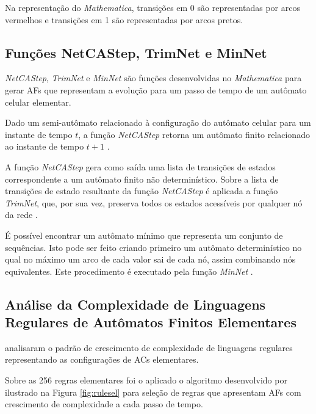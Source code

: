 \documentclass[12pt,a4paper]{article}
\begin{document}
Na representação do \textit{Mathematica}, transições em 0 são
representadas por arcos vermelhos e transições em 1 são
representadas por arcos pretos.

\subsection{Funções NetCAStep, TrimNet e MinNet}

\emph{NetCAStep}, \emph{TrimNet} e \emph{MinNet}  são
funções desenvolvidas no \textit{Mathematica} para gerar AFs
que representam a evolução para um passo de tempo de um autômato celular
elementar.

Dado um semi-autômato relacionado à configuração do autômato celular para
um instante de tempo $t$, a função \emph{NetCAStep} 
retorna um autômato finito relacionado ao instante de tempo $t+1$
.

A função \emph{NetCAStep} gera como saída uma lista de transições
de estados correspondente a um autômato finito não determinístico.
Sobre a lista de transições de estado resultante da função
\emph{NetCAStep} é aplicada a função \emph{TrimNet}, que, por sua vez,
preserva todos os estados acessíveis por qualquer nó da rede
.

É possível encontrar um autômato mínimo que representa um conjunto
de sequências. Isto pode ser feito criando primeiro um autômato
determinístico no qual no máximo um arco de cada valor sai de cada
nó, assim combinando nós equivalentes. Este procedimento é
executado pela função \emph{MinNet} .

\subsection{Análise da Complexidade de Linguagens Regulares de Autômatos
Finitos Elementares}

 analisaram o padrão de crescimento de complexidade
de linguagens regulares representando as configurações de ACs
elementares.

Sobre as 256 regras elementares foi o aplicado o algoritmo desenvolvido
por  ilustrado na Figura \ref{fig:rulesel} para
seleção de regras que apresentam AFs com crescimento de
complexidade a cada passo de tempo.
\end{document}
